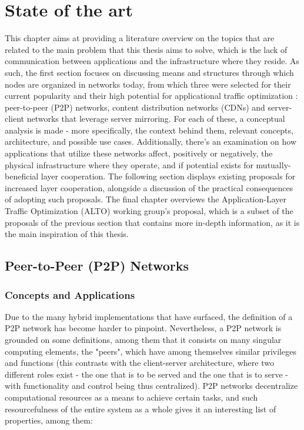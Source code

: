 \chapter{State of the art}

    This chapter aims at providing a literature overview on the topics that are related to the main problem that this thesis aims to solve, which is the lack of communication between applications and the infrastructure where they reside.
    As such, the first section focuses on discussing means and structures through which nodes are organized in networks today, from which three were selected for their current popularity and their high potential for applicational traffic optimization : peer-to-peer (P2P) networks, content distribution networks (CDNs) and server-client networks that leverage server mirroring.
    For each of these, a conceptual analysis is made - more specifically, the context behind them, relevant concepts, architecture, and possible use cases.
    Additionally, there's an examination on how applications that utilize these networks affect, positively or negatively, the physical infrastructure where they operate, and if potential exists for mutually-beneficial layer cooperation.
    The following section displays existing proposals for increased layer cooperation, alongside a discussion of the practical consequences of adopting such proposals.
    The final chapter overviews the Application-Layer Traffic Optimization (ALTO) working group's proposal, which is a subset of the proposals of the previous section that contains more in-depth information, as it is the main inspiration of this thesis.

\section{Peer-to-Peer (P2P) Networks}

\subsection{Concepts and Applications}

    Due to the many hybrid implementations that have surfaced, the definition of a P2P network has become harder to pinpoint.
    Nevertheless, a P2P network is grounded on some definitions, among them that it consists on many singular computing elements, the "peers", which have among themselves similar privileges and functions (this contrasts with the client-server architecture, where two different roles exist - the one that is to be served and the one that is to serve - with functionality and control being thus centralized).
    P2P networks decentralize computational resources as a means to achieve certain tasks, and such resourcefulness of the entire system as a whole gives it an interesting list of properties, among them:

